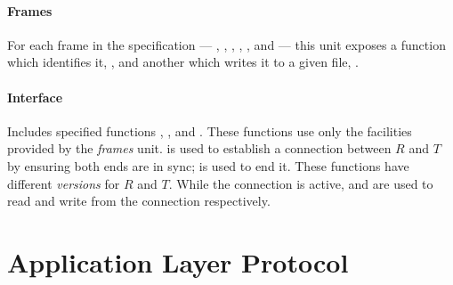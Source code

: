 \documentclass[main.tex]{subfiles}
\begin{document}
\paragraph{Frames} For each frame in the specification --- \fI{}, \fSET{}, \fDISC{}, \fUA{}, \fRR{}, and \fREJ{} --- this unit exposes a function which identifies it, , and another which writes it to a given file, .

\paragraph{Interface} Includes specified functions , ,  and . These functions use only the facilities provided by the \emph{frames} unit.  is used to establish a connection between $R$ and $T$ by ensuring both ends are in sync;  is used to end it. These functions have different \textit{versions} for $R$ and $T$. While the connection is active,  and  are used to read and write from the connection respectively.

\section{Application Layer Protocol}
\end{document}

